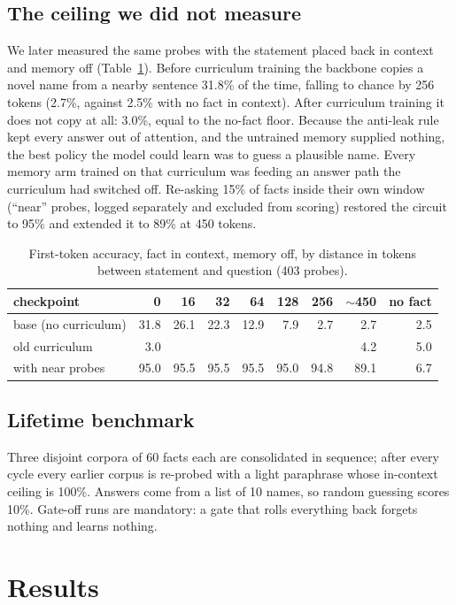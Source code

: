 \documentclass[11pt]{article}
\begin{document}
\subsection{The ceiling we did not measure}
We later measured the same probes with the statement placed back in context
and memory off (Table~\ref{tab:ceiling}). Before curriculum training the
backbone copies a novel name from a nearby sentence 31.8\% of the time, falling
to chance by 256 tokens (2.7\%, against 2.5\% with no fact in context). After curriculum training it does not copy at all:
3.0\%, equal to the no-fact floor. Because the anti-leak rule kept every answer
out of attention, and the untrained memory supplied nothing, the best policy
the model could learn was to guess a plausible name. Every memory arm trained
on that curriculum was feeding an answer path the curriculum had switched off.
Re-asking 15\% of facts inside their own window (``near'' probes, logged
separately and excluded from scoring) restored the circuit to 95\% and extended
it to 89\% at 450 tokens.

\begin{table}[t]\centering\small
\caption{First-token accuracy, fact in context, memory off, by distance in tokens
between statement and question (403 probes).}\label{tab:ceiling}
\begin{tabular}{lrrrrrrrr}\toprule
checkpoint & 0 & 16 & 32 & 64 & 128 & 256 & $\sim$450 & no fact\\\midrule
base (no curriculum) & 31.8 & 26.1 & 22.3 & 12.9 & 7.9 & 2.7 & 2.7 & 2.5\\
old curriculum & 3.0 & & & & & & 4.2 & 5.0\\
with near probes & 95.0 & 95.5 & 95.5 & 95.5 & 95.0 & 94.8 & 89.1 & 6.7\\\bottomrule
\end{tabular}\end{table}

\subsection{Lifetime benchmark}
Three disjoint corpora of 60 facts each are consolidated in sequence; after
every cycle every earlier corpus is re-probed with a light paraphrase whose
in-context ceiling is 100\%. Answers come from a list of 10 names, so random
guessing scores 10\%. Gate-off runs are mandatory: a gate that rolls everything
back forgets nothing and learns nothing.

\section{Results}
\end{document}
